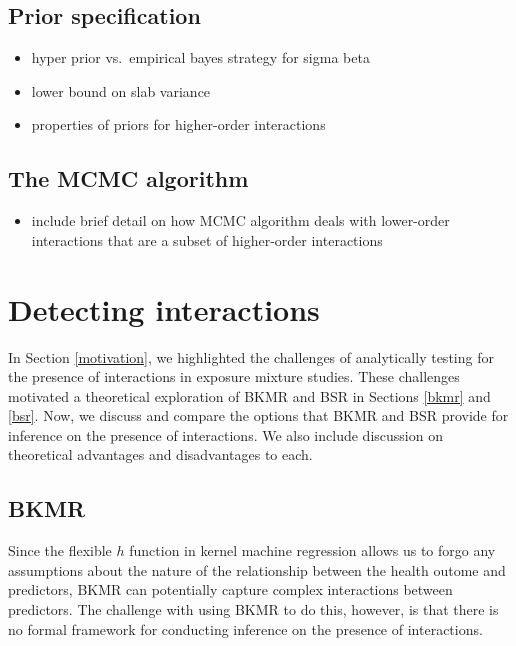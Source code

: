 \documentclass[12pt, twoside]{amherstthesis}
\providecommand{\tightlist}{%
  \setlength{\itemsep}{0pt}\setlength{\parskip}{0pt}}
\begin{document}
\hypertarget{prior-specification-1}{%
\subsection{Prior specification}\label{prior-specification-1}}
\begin{itemize}
\tightlist
\item
  hyper prior vs.~empirical bayes strategy for sigma beta
\item
  lower bound on slab variance
\item
  properties of priors for higher-order interactions
\end{itemize}
\hypertarget{the-mcmc-algorithm-1}{%
\subsection{The MCMC algorithm}\label{the-mcmc-algorithm-1}}
\begin{itemize}
\tightlist
\item
  include brief detail on how MCMC algorithm deals with lower-order interactions that are a subset of higher-order interactions
\end{itemize}
\hypertarget{detecting-interactions}{%
\section{Detecting interactions}\label{detecting-interactions}}

In Section \ref{motivation}, we highlighted the challenges of analytically testing for the presence of interactions in exposure mixture studies. These challenges motivated a theoretical exploration of BKMR and BSR in Sections \ref{bkmr} and \ref{bsr}. Now, we discuss and compare the options that BKMR and BSR provide for inference on the presence of interactions. We also include discussion on theoretical advantages and disadvantages to each.

\hypertarget{bkmr-1}{%
\subsection{BKMR}\label{bkmr-1}}

Since the flexible \(h\) function in kernel machine regression allows us to forgo any assumptions about the nature of the relationship between the health outome and predictors, BKMR can potentially capture complex interactions between predictors. The challenge with using BKMR to do this, however, is that there is no formal framework for conducting inference on the presence of interactions.
\end{document}

